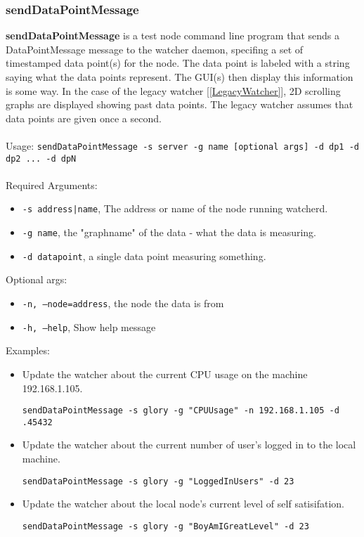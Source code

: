 \newpage
\label{sendDataPointMessage}
\subsubsection{sendDataPointMessage}
{\bf sendDataPointMessage} is a test node command line program that sends a DataPointMessage message to the watcher daemon, specifing a set of timestamped data point(s) for the node. The data point is labeled with a string saying what the data points represent.  The GUI(s) then display this information is some way. In the case of the legacy watcher [\ref{LegacyWatcher}], 2D scrolling graphs are displayed showing past data points. The legacy watcher assumes that data points are given once a second.
\\\\
Usage: 
{\tt sendDataPointMessage -s server -g name [optional args] -d dp1 -d dp2 ... -d dpN}
\\\\
Required Arguments:
\begin{itemize}
\item {\tt -s address|name}, The address or name of the node running watcherd.
\item {\tt -g name}, the "graphname" of the data - what the data is measuring.
\item {\tt -d datapoint}, a single data point measuring something.
\end{itemize}
Optional args:
\begin{itemize}
\item {\tt -n, --node=address}, the node the data is from 
\item {\tt -h, --help}, Show help message
\end{itemize}
Examples:
\begin{itemize}
\item Update the watcher about the current CPU usage on the machine 192.168.1.105.  
    
{\tt sendDataPointMessage -s glory -g "CPUUsage" -n 192.168.1.105 -d .45432}

\item Update the watcher about the current number of user's logged in to the local machine.   

{\tt sendDataPointMessage -s glory -g "LoggedInUsers" -d 23}

\item Update the watcher about the local node's current level of self satisifation.

{\tt sendDataPointMessage -s glory -g "BoyAmIGreatLevel" -d 23}

\end{itemize}
